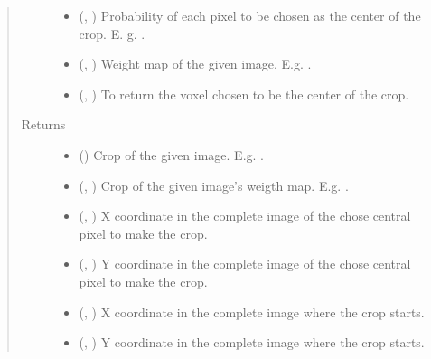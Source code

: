 \documentclass[letterpaper,10pt,english]{sphinxmanual}
\begin{document}
\begin{fulllineitems}
\begin{quote}
\begin{description}
\begin{itemize}
\item {} 
 (, ) \textendash{} Probability of each pixel to be chosen as the center of the crop. E. g. .

\item {} 
 (, ) \textendash{} Weight map of the given image. E.g. .

\item {} 
 (, ) \textendash{} To return the voxel chosen to be the center of the crop.

\end{itemize}

\item[{Returns}] \leavevmode
\begin{itemize}
\item {} 
 () \textendash{} Crop of the given image. E.g. .

\item {} 
 (, ) \textendash{} Crop of the given image’s weigth map. E.g. .

\item {} 
 (, ) \textendash{} X coordinate in the complete image of the chose central pixel to
make the crop.

\item {} 
 (, ) \textendash{} Y coordinate in the complete image of the chose central pixel to
make the crop.

\item {} 
 (, ) \textendash{} X coordinate in the complete image where the crop starts.

\item {} 
 (, ) \textendash{} Y coordinate in the complete image where the crop starts.

\end{itemize}


\end{description}\end{quote}

\end{fulllineitems}
\end{document}
